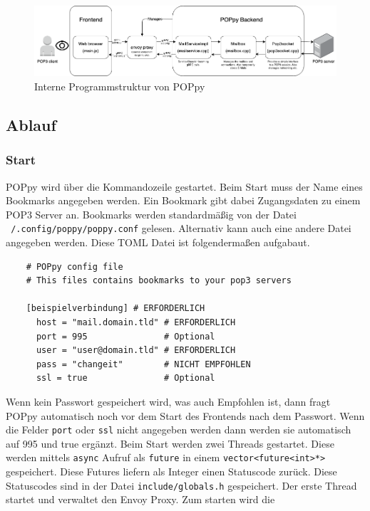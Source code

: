 \documentclass[12pt]{article}
\def\code#1{\texttt{#1}}
\begin{document}
\begin{figure}[htbp]
    \includegraphics[scale=0.4]{poppy_app_diagram}
    \caption{Interne Programmstruktur von POPpy}
    \label{fig:situation2}
\end{figure}
\FloatBarrier

\subsection{Ablauf}
\subsubsection{Start}
POPpy wird über die Kommandozeile gestartet. Beim Start muss der Name eines
Bookmarks angegeben werden. Ein Bookmark gibt dabei Zugangsdaten zu einem POP3 
Server an. Bookmarks werden standardmäßig von der Datei 
\code{~/.config/poppy/poppy.conf} gelesen. Alternativ kann auch eine andere 
Datei angegeben werden. Diese TOML Datei ist folgendermaßen aufgabaut.
\begin{verbatim}
    # POPpy config file
    # This files contains bookmarks to your pop3 servers

    [beispielverbindung] # ERFORDERLICH
      host = "mail.domain.tld" # ERFORDERLICH
      port = 995               # Optional
      user = "user@domain.tld" # ERFORDERLICH
      pass = "changeit"        # NICHT EMPFOHLEN 
      ssl = true               # Optional 
\end{verbatim}
Wenn kein Passwort gespeichert wird, was auch Empfohlen ist, dann fragt POPpy
automatisch noch vor dem Start des Frontends nach dem Passwort. Wenn die Felder
\code{port} oder \code{ssl} nicht angegeben werden dann werden sie automatisch
auf 995 und true ergänzt. 
\newline
\newline
Beim Start werden zwei Threads gestartet. Diese werden mittels \code{async}
Aufruf als \code{future} in einem \code{vector<future<int>*>} gespeichert.
Diese Futures liefern als Integer einen Statuscode zurück. Diese Statuscodes
sind in der Datei \code{include/globals.h} gespeichert.
\newline
Der erste Thread startet und verwaltet den Envoy Proxy. Zum starten wird die
\end{document}
